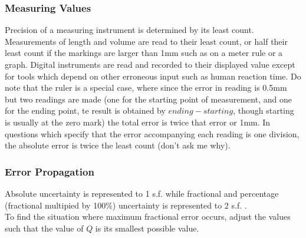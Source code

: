 \documentclass[../main]{subfiles}
\begin{document}



	\subsubsection{Measuring Values}

	Precision of a measuring instrument is determined by its least count. Measurements of length and volume are read to their least count, or half their least count if the markings are larger than 1mm such as on a meter rule or a graph. Digital instruments are read and recorded to their displayed value except for tools which depend on other erroneous input such as human reaction time. Do note that the ruler is a special case, where since the error in reading is 0.5mm but two readings are made (one for the starting point of measurement, and one for the ending point, te result is obtained by \(ending-starting\), though starting is usually at the zero mark) the total error is twice that error or 1mm. In questions which specify that the error accompanying each reading is one division, the absolute error is twice the least count (don't ask me why).

	\subsubsection{Error Propagation}


	Absolute uncertainty is represented to 1 s.f. while fractional and percentage (fractional multipied by 100\%) uncertainty is represented to 2 s.f. . \\

	To find the situation where maximum fractional error occurs, adjust the values such that the value of \(Q\) is its smallest possible value. \\
\end{document}
